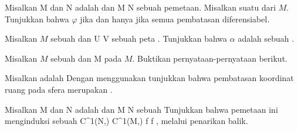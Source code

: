\setcounter{section}{8}


{}
{

Misalkan
\mathkor {} {M} {dan} {N} {}
adalah
dan
\maabbdisp {\varphi} { M } { N
} {}
sebuah pemetaan. Misalkan
 suatu
dari $M$. Tunjukkan bahwa $\varphi$
jika dan hanya jika semua pembatasan
 diferensiabel.

}
{} {}

{}
{

Misalkan $M$ sebuah
dan
\maabbdisp {\alpha} { U } { V
} {}
sebuah peta
 {} {.}
Tunjukkan bahwa $\alpha$ adalah sebuah
.

}
{} {}

{}
{

Misalkan $M$ sebuah
 dan
 { M } {\R
} {}
 pada $M$. Buktikan pernyataan-pernyataan berikut. 

}
{} {}

{}
{

Misalkan
 adalah
Dengan menggunakan
tunjukkan bahwa pembatasan koordinat ruang
 pada sfera merupakan
.

}
{} {}

{}
{

Misalkan
\mathkor {} {M} {dan} {N} {}
adalah
dan
\maabbdisp {\varphi} { M } { N
} {}
sebuah
Tunjukkan bahwa pemetaan ini menginduksi sebuah
\maabbeledisp {\varphi^*} {C^1(N,\R)} {C^1(M,\R)
} { f } {f \circ \varphi
} {,}
melalui penarikan balik.

}
{} {}

